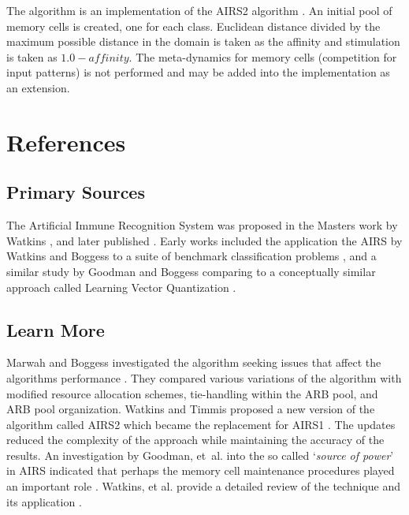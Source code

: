 \documentclass[a4paper, 11pt]{article}
\begin{document}
The algorithm is an implementation of the AIRS2 algorithm \cite{Watkins2002b}. An initial pool of memory cells is created, one for each class. Euclidean distance divided by the maximum possible distance in the domain is taken as the affinity and stimulation is taken as $1.0-affinity$. The meta-dynamics for memory cells (competition for input patterns) is not performed and may be added into the implementation as an extension.




\section{References}
\label{sec:references}

% 
% 
\subsection{Primary Sources}
The Artificial Immune Recognition System was proposed in the Masters work by Watkins \cite{Watkins2001}, and later published \cite{Watkins2002a}.
Early works included the application the AIRS by Watkins and Boggess to a suite of benchmark classification problems \cite{Watkins2002}, and a similar study by Goodman and Boggess comparing to a conceptually similar approach called Learning Vector Quantization \cite{Goodman2002}.

% 
% 
\subsection{Learn More}
Marwah and Boggess investigated the algorithm seeking issues that affect the algorithms performance \cite{Marwah2002}. They compared various variations of the algorithm with modified resource allocation schemes, tie-handling within the ARB pool, and ARB pool organization.
Watkins and Timmis proposed a new version of the algorithm called AIRS2 which became the replacement for AIRS1 \cite{Watkins2002b}. The updates reduced the complexity of the approach while maintaining the accuracy of the results. An investigation by Goodman, et~al. into the so called `\emph{source of power}' in AIRS indicated that perhaps the memory cell maintenance procedures played an important role \cite{Goodman2003}.
Watkins, et al. provide a detailed review of the technique and its application \cite{Watkins2004a}.
\end{document}
